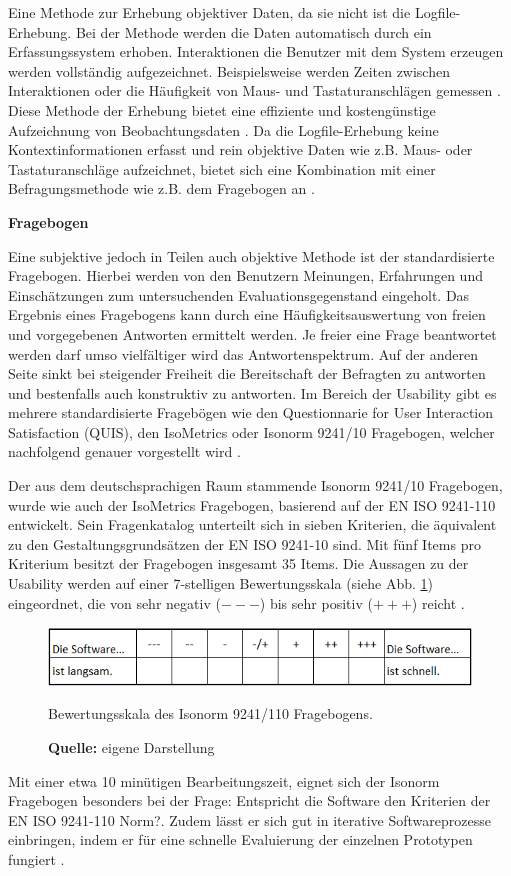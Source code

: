 Eine Methode zur Erhebung objektiver Daten, da sie nicht  ist die Logfile-Erhebung. Bei der Methode werden die Daten automatisch durch ein Erfassungssystem erhoben. Interaktionen die Benutzer mit dem System erzeugen werden vollständig aufgezeichnet. Beispielsweise werden Zeiten zwischen Interaktionen oder die Häufigkeit von Maus- und Tastaturanschlägen gemessen \citep[vgl.][63]{Hegner2003}. Diese Methode der Erhebung bietet eine effiziente und kostengünstige Aufzeichnung von Beobachtungsdaten \citep[vgl.][Kap. 65.3]{Baur2014}. Da die Logfile-Erhebung keine Kontextinformationen erfasst und rein objektive Daten wie z.B. Maus- oder Tastaturanschläge aufzeichnet, bietet sich eine Kombination mit einer Befragungsmethode wie z.B. dem Fragebogen an \citep[vgl.][17\psq]{Hegner2003}.

\textbf{Fragebogen}

Eine subjektive jedoch in Teilen auch objektive Methode ist der standardisierte Fragebogen. Hierbei werden von den Benutzern Meinungen, Erfahrungen und Einschätzungen zum untersuchenden Evaluationsgegenstand eingeholt. Das Ergebnis eines Fragebogens kann durch eine Häufigkeitsauswertung von freien und vorgegebenen Antworten ermittelt werden. Je freier eine Frage beantwortet werden darf umso vielfältiger wird das Antwortenspektrum. Auf der anderen Seite sinkt bei steigender Freiheit die Bereitschaft der Befragten zu antworten und bestenfalls auch konstruktiv zu antworten. Im Bereich der Usability gibt es mehrere standardisierte Fragebögen wie den Questionnarie for User Interaction Satisfaction (QUIS), den IsoMetrics oder Isonorm 9241/10 Fragebogen, welcher nachfolgend genauer vorgestellt wird \citep[vgl.][Kap. 4.5.1.1]{Hegner2003}.

Der aus dem deutschsprachigen Raum stammende Isonorm 9241/10 Fragebogen, wurde wie auch der IsoMetrics Fragebogen, basierend auf der EN ISO 9241-110 entwickelt. Sein Fragenkatalog unterteilt sich in sieben Kriterien, die äquivalent zu den Gestaltungsgrundsätzen der EN ISO 9241-10 sind. Mit fünf Items pro Kriterium besitzt der Fragebogen insgesamt 35 Items. Die Aussagen zu der Usability werden auf einer 7-stelligen Bewertungsskala (siehe Abb. \ref{fig:IsonormBewertungsskala}) eingeordnet, die von sehr negativ (\glqq $---$\grqq{}) bis sehr positiv (\glqq $+++$\grqq{}) reicht \citep[vgl.][Kap. 3.3]{Figl2010}. 
\begin{figure}[H]
  \centering
  \includegraphics[scale=0.95]{img/Isonorm_Bewertungsskala.PNG}
  \caption{Bewertungsskala des Isonorm 9241/110 Fragebogens.}
  \caption*{\textbf{Quelle:} eigene Darstellung}
  \label{fig:IsonormBewertungsskala}
\end{figure}
Mit einer etwa 10 minütigen Bearbeitungszeit, eignet sich der Isonorm Fragebogen besonders bei der Frage: \glqq Entspricht die Software den Kriterien der EN ISO 9241-110 Norm?\grqq{}. Zudem lässt er sich gut in iterative Softwareprozesse einbringen, indem er für eine schnelle Evaluierung der einzelnen Prototypen fungiert \citep[vgl.][Kap. 3.3]{Figl2010}.

